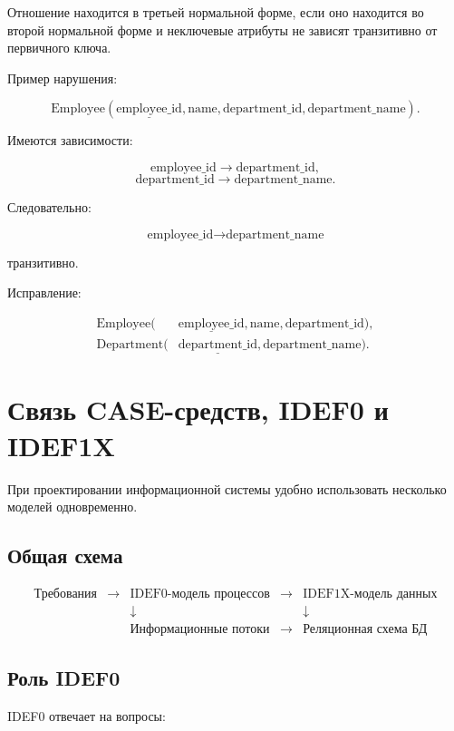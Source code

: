 \documentclass[12pt,a4paper]{article}
\theoremstyle{remark}
\begin{document}
Отношение находится в третьей нормальной форме, если оно находится во второй нормальной форме и неключевые атрибуты не зависят транзитивно от первичного ключа.

Пример нарушения:

\[
    \text{Employee}(\underline{\text{employee\_id}}, \text{name}, \text{department\_id}, \text{department\_name}).
\]

Имеются зависимости:

\[
    \text{employee\_id} \rightarrow \text{department\_id},
\]
\[
    \text{department\_id} \rightarrow \text{department\_name}.
\]

Следовательно:

\[
    \text{employee\_id} \rightarrow \text{department\_name}
\]

транзитивно.

Исправление:

\[
\begin{aligned}
    \text{Employee}(&\underline{\text{employee\_id}}, \text{name}, \text{department\_id}),\\
    \text{Department}(&\underline{\text{department\_id}}, \text{department\_name}).
\end{aligned}
\]

\section{Связь CASE-средств, IDEF0 и IDEF1X}

При проектировании информационной системы удобно использовать несколько моделей одновременно.

\subsection{Общая схема}

\[
\begin{array}{ccccc}
\text{Требования}
& \rightarrow &
\text{IDEF0-модель процессов}
& \rightarrow &
\text{IDEF1X-модель данных}
\\
& &
\downarrow
& &
\downarrow
\\
& &
\text{Информационные потоки}
& \rightarrow &
\text{Реляционная схема БД}
\end{array}
\]

\subsection{Роль IDEF0}

IDEF0 отвечает на вопросы:
\end{document}
